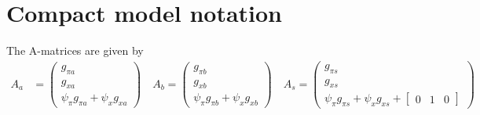 \documentclass[11pt]{article}
\renewcommand{\[}{\begin{equation}}
\renewcommand{\]}{\end{equation}}
\begin{document}


\section{Compact model notation}\label{app_compact} 
The A-matrices are given by
\begin{align}
A_a & = \begin{pmatrix} g_{\pi a} \\ g_{x a} \\ \psi_{\pi}g_{\pi a} + \psi_xg_{x a}
\end{pmatrix}
\quad A_b = \begin{pmatrix} g_{\pi b} \\ g_{x b} \\ \psi_{\pi}g_{\pi b} + \psi_xg_{x b}
\end{pmatrix}
 \quad A_s = \begin{pmatrix} g_{\pi s} \\ g_{x s} \\ \psi_{\pi}g_{\pi s} + \psi_xg_{x s} + \begin{bmatrix} 0 & 1& 0\end{bmatrix}
\end{pmatrix} \\

\end{align}
\end{document}
